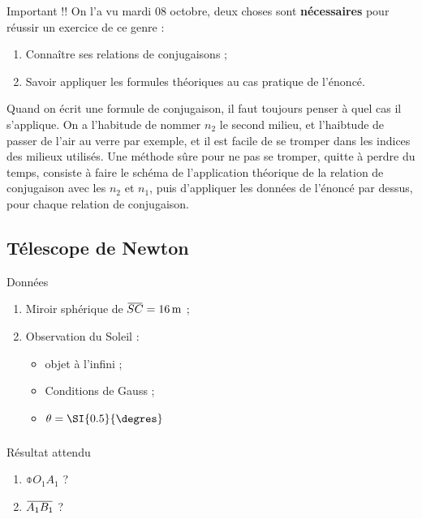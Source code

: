 \documentclass[10pt,a5paper,notitlepage]{book}
\begin{document}
\begin{bvtcb}{Important !!}
    On l'a vu mardi 08 octobre, deux choses sont \textbf{nécessaires} pour
    réussir un exercice de ce genre :
    \begin{enumerate}
        \item {\huge Connaître ses relations de conjugaisons} ;
        \item {\Huge Savoir appliquer les formules théoriques au cas pratique de
            l'énoncé}.
    \end{enumerate}
    Quand on écrit une formule de conjugaison, il faut toujours penser à quel
    cas il s'applique. On a l'habitude de nommer $n_2$ le second milieu, et
    l'haibtude de passer de l'air au verre par exemple, et il est facile de se
    tromper dans les indices des milieux utilisés. Une méthode sûre pour ne pas
    se tromper, quitte à perdre du temps, consiste à faire le schéma de
    l'application théorique de la relation de conjugaison avec les $n_2$ et
    $n_1$, puis d'appliquer les données de l'énoncé par dessus, pour chaque
    relation de conjugaison.
\end{bvtcb}

\subsection{Télescope de Newton}
\begin{vtcb}{Données}
    \begin{enumerate}
        \item Miroir sphérique de $\SC = \SI{16}{m}$ ;
        \item Observation du Soleil :
            \begin{itemize}
                \item objet à l'infini ;
                \item Conditions de Gauss ;
                \item $\t = \SI{0.5}{\degres}$
            \end{itemize}
    \end{enumerate}
\end{vtcb}

\subsubsection{}

\begin{rtcb}{Résultat attendu}
    \begin{enumerate}
        \item $\obar{O_1A_1}$ ?
        \item $\ABa$ ?
    \end{enumerate}
\end{rtcb}
\end{document}

